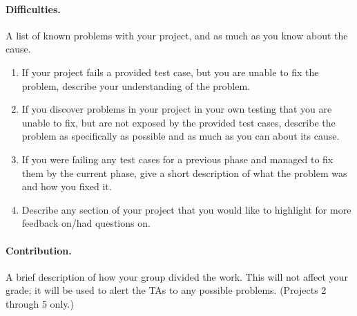 \documentclass[11pt]{article}
\begin{document}
\paragraph{Difficulties.}
A list of known problems with your project, and as much as you know about the cause.
\begin{enumerate}
\item If your project fails a provided test case, but you are unable to fix the problem, describe your understanding of the problem.
\item If you discover problems in your project in your own testing that you are unable to fix, but are not exposed by the provided test cases, describe the problem as specifically as possible and as much as you can about its cause.
\item If you were failing any test cases for a previous phase and managed to fix them by the current phase, give a short description of what the problem was and how you fixed it.
\item Describe any section of your project that you would like to highlight for more feedback on/had questions on.
\end{enumerate}

\paragraph{Contribution.}
A brief description of how your group divided the work.
This will not affect your grade; it will be used to alert the TAs to any possible problems.
(Projects 2 through 5 only.)
\end{document}
